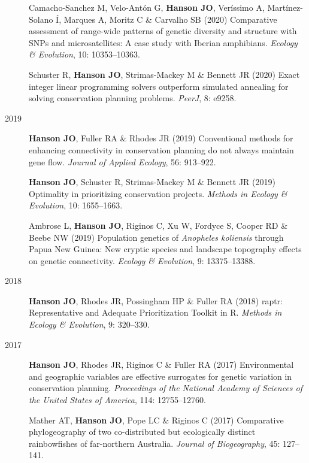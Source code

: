 \documentclass[12pt,a4paper]{article}
\begin{document}
\begin{description}
\item[] Camacho-Sanchez M, Velo-Antón G, \textbf{Hanson JO}, Veríssimo A, Martínez-Solano Í, Marques A, Moritz C \& Carvalho SB (2020) Comparative assessment of range-wide patterns of genetic diversity and structure with SNPs and microsatellites: A case study with Iberian amphibians. \textit{Ecology \& Evolution}, 10: 10353--10363.

\item[] Schuster R, \textbf{Hanson JO}, Strimas-Mackey M \& Bennett JR (2020) Exact integer linear programming solvers outperform simulated annealing for solving conservation planning problems. \textit{PeerJ}, 8: e9258.

\item[2019] \textbf{Hanson JO}, Fuller RA \& Rhodes JR (2019) Conventional methods for enhancing connectivity in conservation planning do not always maintain gene flow. \textit{Journal of Applied Ecology}, 56: 913--922.

\item[] \textbf{Hanson JO}, Schuster R, Strimas-Mackey M \& Bennett JR (2019) Optimality in prioritizing conservation projects. \textit{Methods in Ecology \& Evolution}, 10: 1655--1663.

\item[] Ambrose L, \textbf{Hanson JO}, Riginos C, Xu W, Fordyce S, Cooper RD \& Beebe NW (2019) Population genetics of \textit{Anopheles koliensis} through Papua New Guinea: New cryptic species and landscape topography effects on genetic connectivity. \textit{Ecology \& Evolution}, 9: 13375--13388.

\item[2018] \textbf{Hanson JO}, Rhodes JR, Possingham HP \& Fuller RA (2018) raptr: Representative and Adequate Prioritization Toolkit in R. \textit{Methods in Ecology \& Evolution}, 9: 320--330.

\item[2017] \textbf{Hanson JO}, Rhodes JR, Riginos C \& Fuller RA (2017) Environmental and geographic variables are effective surrogates for genetic variation in conservation planning. \textit{Proceedings of the National Academy of Sciences of the United States of America}, 114: 12755--12760.

\item[] Mather AT, \textbf{Hanson JO}, Pope LC \& Riginos C (2017) Comparative phylogeography of two co-distributed but ecologically distinct rainbowfishes of far-northern Australia. \textit{Journal of Biogeography}, 45: 127--141.


\end{description}
\end{document}
